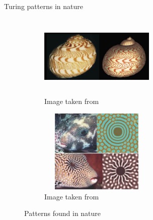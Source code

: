 \documentclass{beamer}
\begin{document}
\begin{frame}{Turing patterns in nature}
    \begin{figure}[H]
        \begin{subfigure}[b]{0.45\linewidth}
            \centering
            \includegraphics[width=5.5cm,height=4cm]{shell.png}
            \caption{Image taken from \cite{turing1}}
        \end{subfigure}
        \begin{subfigure}[b]{0.45\linewidth}
            \centering
            \includegraphics[width=5.5cm,height=4cm]{turing1.png}
            \caption{Image taken from \cite{nature}}
        \end{subfigure}
        \caption{Patterns found in nature}
    \end{figure}

\end{frame}
\end{document}
